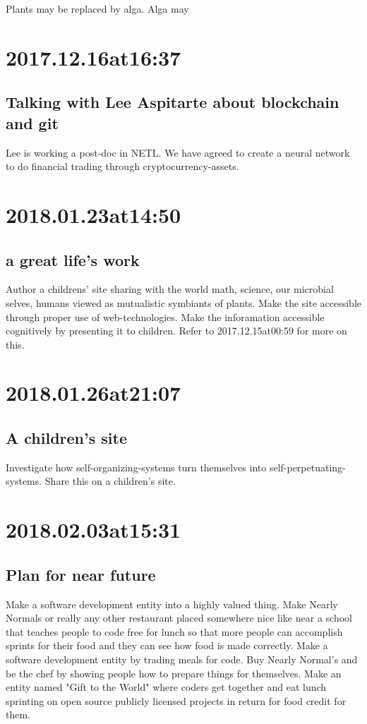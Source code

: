 \begin{enumerate}
\begin{enumerate}
Plants may be replaced by alga. Alga may 

\section*{ 2017.12.16at16:37 }
\subsection*{ Talking with Lee Aspitarte about blockchain and git }
Lee is working a post-doc in NETL. We have agreed to create a neural network to do financial trading through cryptocurrency-assets.

\section*{ 2018.01.23at14:50 }
\subsection*{ a great life's work }
Author a childrens' site sharing with the world math, science, our microbial selves, humans viewed as mutualistic symbiants of plants. Make the site accessible through proper use of web-technologies. Make the inforamation accessible cognitively by presenting it to children. Refer to 2017.12.15at00:59 for more on this.

\section*{ 2018.01.26at21:07 }
\subsection*{ A children's site }
Investigate how self-organizing-systems turn themselves into self-perpetuating-systems.
Share this on a children's site.

\section*{ 2018.02.03at15:31 }
\subsection*{ Plan for near future }
Make a software development entity into a highly valued thing.
Make Nearly Normals or really any other restaurant placed somewhere nice like near a school that teaches people to code free for lunch so that more people can accomplish sprints for their food and they can see how food is made correctly.
Make a software development entity by trading meals for code.
Buy Nearly Normal's and be the chef by showing people how to prepare things for themselves.
Make an entity named "Gift to the World" where coders get together and eat lunch sprinting on open source publicly licensed projects in return for food credit for them.


\end{enumerate}
\end{enumerate}
